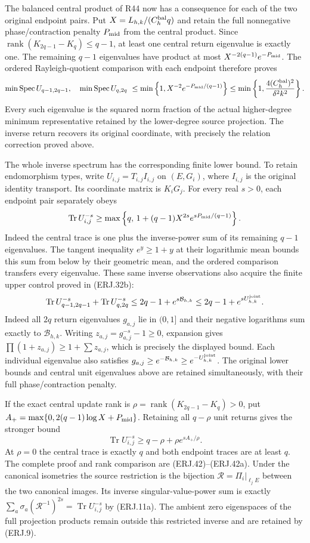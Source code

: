 The balanced central product of R44 now has a consequence for each
of the two original endpoint pairs. Put
$X=L_{h,k}/(C_h^{\rm bal}q)$ and retain the full nonnegative
phase/contraction penalty $P_{\rm mid}$ from the central product.
Since $\operatorname{rank}(K_{2q-1}-K_q)\le q-1$, at least
one central return eigenvalue is exactly one. The remaining
$q-1$ eigenvalues have product at most
$X^{-2(q-1)}e^{-P_{\rm mid}}$. The ordered Rayleigh-quotient
comparison with each endpoint therefore proves
\[
 \min\operatorname{Spec}U_{q-1,2q-1},\quad
 \min\operatorname{Spec}U_{q,2q}
 \ \le\min\left\{1,X^{-2}e^{-P_{\rm mid}/(q-1)}\right\}
 \le\min\left\{1,\frac{4(C_h^{\rm bal})^2}{\delta^2k^2}\right\}.
\]
Every such eigenvalue is the squared norm fraction of the actual
higher-degree minimum representative retained by the lower-degree
source projection. The inverse return recovers its original
coordinate, with precisely the relation correction proved above.



The whole inverse spectrum has the corresponding finite lower bound.
To retain endomorphism types, write
$U_{i,j}=T_{i,j}I_{i,j}$ on $(E,G_i)$, where $I_{i,j}$ is the
original identity transport. Its coordinate matrix is $K_iG_j$.
For every real $s>0$, each endpoint pair separately obeys
\[
 \operatorname{Tr}U_{i,j}^{-s}
 \ge\max\left\{q,\,
 1+(q-1)X^{2s}e^{sP_{\rm mid}/(q-1)}\right\}.
\]
Indeed the central trace is one plus the inverse-power sum of its
remaining $q-1$ eigenvalues. The tangent inequality $e^y\ge1+y$
at their logarithmic mean bounds this sum from below by their
geometric mean, and the ordered comparison transfers every eigenvalue.
These same inverse observations also acquire the finite upper
control proved in (ERJ.32b):
\[
 \operatorname{Tr}U_{q-1,2q-1}^{-s}
 +\operatorname{Tr}U_{q,2q}^{-s}
 \le2q-1+e^{s\mathcal B_{h,k}}
 \le2q-1+e^{sU_{h,k}^{\rm joint}}.
\]
Indeed all $2q$ return eigenvalues $g_{a,j}$ lie in $(0,1]$ and
their negative logarithms sum exactly to $\mathcal B_{h,k}$.
Writing $z_{a,j}=g_{a,j}^{-s}-1\ge0$, expansion gives
$\prod(1+z_{a,j})\ge1+\sum z_{a,j}$, which is precisely the
displayed bound. Each individual eigenvalue also satisfies
$g_{a,j}\ge e^{-\mathcal B_{h,k}}\ge e^{-U_{h,k}^{\rm joint}}$.
The original lower bounds and central unit eigenvalues above are
retained simultaneously, with their full phase/contraction penalty.

If the exact central update rank is
$\rho=\operatorname{rank}(K_{2q-1}-K_q)>0$, put
$A_+=\max\{0,2(q-1)\log X+P_{\rm mid}\}$. Retaining all
$q-\rho$ unit returns gives the stronger bound
\[
 \operatorname{Tr}U_{i,j}^{-s}
 \ge q-\rho+\rho e^{sA_+/\rho}.
\]
At $\rho=0$ the central trace is exactly $q$ and both endpoint
traces are at least $q$. The complete proof and rank comparison are
(ERJ.42)--(ERJ.42a).
Under the canonical isometries the source restriction is the
bijection $\mathcal R=\Pi_i|_{\ell_jE}$ between the two canonical
images. Its inverse singular-value-power sum is exactly
$\sum_a\sigma_a(\mathcal R^{-1})^{2s}
=\operatorname{Tr}U_{i,j}^{-s}$ by (ERJ.11a).
The ambient zero eigenspaces of the full projection products remain
outside this restricted inverse and are retained by (ERJ.9).


